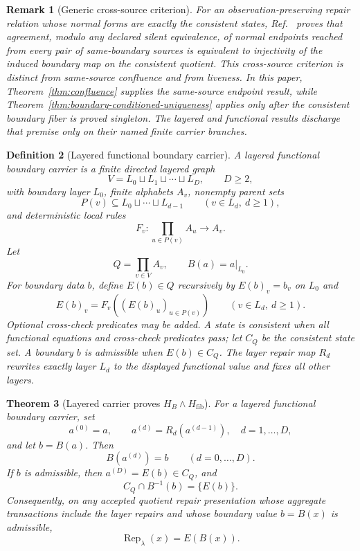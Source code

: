 \documentclass[11pt]{article}
\newtheorem{theorem}{Theorem}[section]
\newtheorem{definition}[theorem]{Definition}
\newtheorem{remark}[theorem]{Remark}
\begin{document}
\begin{remark}[Generic cross-source criterion]
For an observation-preserving repair relation whose normal forms are exactly the consistent
states, Ref.~\cite{observableNormalForms} proves that agreement, modulo any declared silent
equivalence, of normal endpoints reached from every pair of same-boundary sources is equivalent
to injectivity of the induced boundary map on the consistent quotient. This cross-source
criterion is distinct from same-source confluence and from liveness. In this paper,
Theorem~\ref{thm:confluence} supplies the same-source endpoint result, while
Theorem~\ref{thm:boundary-conditioned-uniqueness} applies only after the consistent boundary
fiber is proved singleton. The layered and functional results discharge that premise only on
their named finite carrier branches.
\end{remark}

\begin{definition}[Layered functional boundary carrier]\label{def:layered-functional-boundary-carrier}
A layered functional boundary carrier is a finite directed layered graph
\[
V=L_0\sqcup L_1\sqcup\cdots\sqcup L_D,\qquad D\ge2,
\]
with boundary layer \(L_0\), finite alphabets \(A_v\), nonempty parent sets
\[
P(v)\subseteq L_0\sqcup\cdots\sqcup L_{d-1}\qquad(v\in L_d,\ d\ge1),
\]
and deterministic local rules
\[
F_v:\prod_{u\in P(v)}A_u\to A_v.
\]
Let
\[
Q=\prod_{v\in V}A_v,\qquad B(a)=a|_{L_0}.
\]
For boundary data \(b\), define \(E(b)\in Q\) recursively by \(E(b)_v=b_v\) on \(L_0\) and
\[
E(b)_v=F_v((E(b)_u)_{u\in P(v)})
\qquad(v\in L_d,\ d\ge1).
\]
Optional cross-check predicates may be added.  A state is consistent when all functional equations
and cross-check predicates pass; let \(C_Q\) be the consistent state set.  A boundary \(b\) is
admissible when \(E(b)\in C_Q\).  The layer repair map \(R_d\) rewrites exactly layer \(L_d\) to
the displayed functional value and fixes all other layers.
\end{definition}

\begin{theorem}[Layered carrier proves \(H_B\wedge H_{\mathrm{fib}}\)]\label{thm:layered-carrier-HB-Hfib}
For a layered functional boundary carrier, set
\[
a^{(0)}=a,\qquad a^{(d)}=R_d(a^{(d-1)}),\quad d=1,\ldots,D,
\]
and let \(b=B(a)\).  Then
\[
B(a^{(d)})=b\qquad(d=0,\ldots,D).
\]
If \(b\) is admissible, then \(a^{(D)}=E(b)\in C_Q\), and
\[
C_Q\cap B^{-1}(b)=\{E(b)\}.
\]
Consequently, on any accepted quotient repair presentation whose aggregate transactions include
the layer repairs and whose boundary value \(b=B(x)\) is admissible,
\[
\operatorname{Rep}_\lambda(x)=E(B(x)).
\]
\end{theorem}
\end{document}
